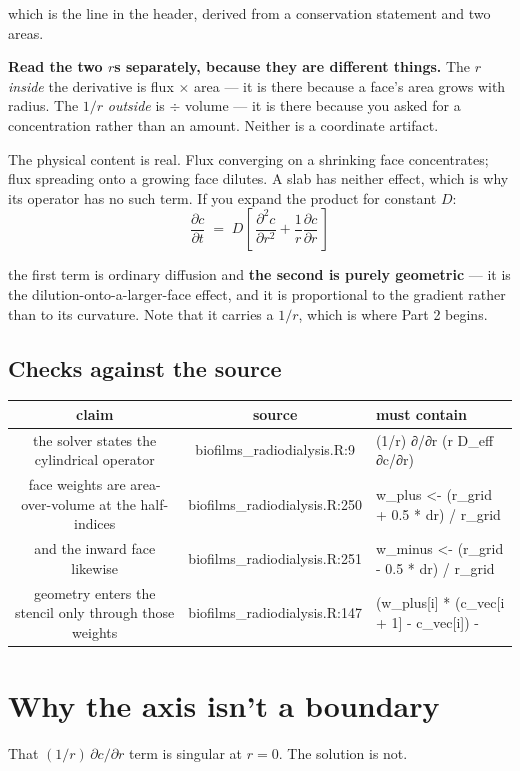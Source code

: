 \documentclass[11pt]{article}
\newcommand{\us}{\_\allowbreak}
\newcommand{\checkhead}{%
  \toprule
  \textbf{\normalsize claim} & \textbf{\normalsize source} & \textbf{\normalsize must contain} \\
  \midrule
}
\begin{document}
which is the line in the header, derived from a conservation statement and two areas.

\textbf{Read the two $r$s separately, because they are different things.} The $r$
\emph{inside} the derivative is flux $\times$ area — it is there because a face's area grows
with radius. The $1/r$ \emph{outside} is $\div$ volume — it is there because you asked for a
concentration rather than an amount. Neither is a coordinate artifact.

The physical content is real. Flux converging on a shrinking face concentrates;
flux spreading onto a growing face dilutes. A slab has neither effect, which is why its
operator has no such term. If you expand the product for constant $D$:
\[
\frac{\partial c}{\partial t}
\;=\; D\left[\, \frac{\partial^2 c}{\partial r^2}
  + \frac{1}{r}\frac{\partial c}{\partial r} \,\right]
\]

the first term is ordinary diffusion and \textbf{the second is purely geometric} — it is the
dilution-onto-a-larger-face effect, and it is proportional to the gradient rather than to its
curvature. Note that it carries a $1/r$, which is where Part 2 begins.

\subsection*{Checks against the source}

\begin{longtable}{CSF}
\checkhead
\endhead
the solver states the cylindrical operator
  & biofilms\us radiodialysis.R:9
  & (1/r) ∂/∂r (r D\_eff ∂c/∂r) \\[0.35em]
face weights are area-over-volume at the half-indices
  & biofilms\us radiodialysis.R:250
  & w\_plus  <- (r\_grid + 0.5 * dr) / r\_grid \\[0.35em]
and the inward face likewise
  & biofilms\us radiodialysis.R:251
  & w\_minus <- (r\_grid - 0.5 * dr) / r\_grid \\[0.35em]
geometry enters the stencil only through those weights
  & biofilms\us radiodialysis.R:147
  & (w\_plus[i]  * (c\_vec[i + 1] - c\_vec[i]) - \\
\bottomrule
\end{longtable}

\section{Why the axis isn't a boundary}

That $(1/r)\,\partial c/\partial r$ term is singular at $r = 0$. The solution is not.
\end{document}
